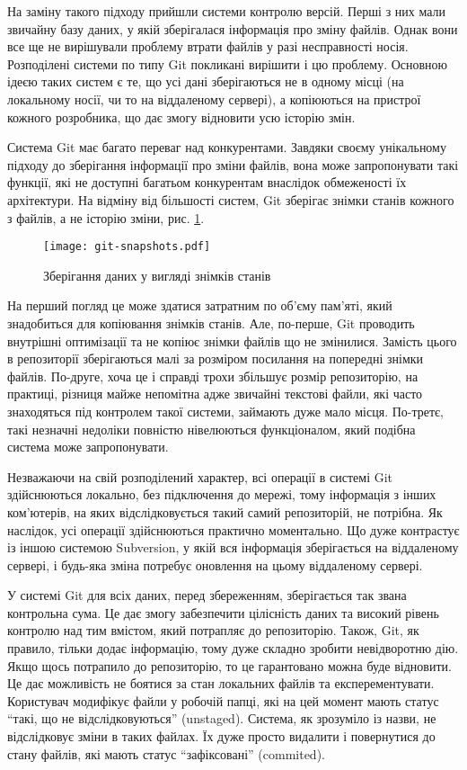 На заміну такого підходу прийшли системи контролю версій. Перші з них мали звичайну
базу даних, у якій зберігалася інформація про зміну файлів. Однак вони все ще не
вирішували проблему втрати файлів у разі несправності носія. Розподілені системи
по типу Git покликані вирішити і цю проблему. Основною ідеєю таких систем є те, що
усі дані зберігаються не в одному місці (на локальному носії, чи то на віддаленому
сервері), а копіюються на пристрої кожного розробника, що дає змогу відновити усю історію
змін.

Система Git має багато переваг над конкурентами. Завдяки своєму унікальному підходу
до зберігання інформації про зміни файлів, вона може запропонувати такі функції,
які не доступні багатьом конкурентам внаслідок обмеженості їх архітектури.
На відміну від більшості систем, Git зберігає знімки станів кожного з файлів, а не історію
зміни, рис. \ref{img:git_snapshots}.

\begin{figure}[ht]
  \begin{center}
    \texttt{[image: git-snapshots.pdf]}
  \end{center}
  \caption{Зберігання даних у вигляді знімків станів}
  \label{img:git_snapshots}
\end{figure}

На перший погляд це може здатися затратним по об'єму пам'яті, який знадобиться для 
копіювання знімків станів. Але, по-перше,
Git проводить внутрішні оптимізації та не копіює знімки
файлів що не змінилися. Замість цього в репозиторії зберігаються малі за розміром посилання
на попередні знімки файлів. По-друге, хоча це і справді трохи збільшує розмір репозиторію,
на практиці, різниця майже непомітна адже звичайні текстові файли, які часто знаходяться
під контролем такої системи, займають дуже мало місця. По-третє, такі незначні недоліки
повністю нівелюються функціоналом, який подібна система може запропонувати.

Незважаючи на свій розподілений характер, всі операції в системі Git здійснюються локально,
без підключення до мережі, тому інформація з інших ком'ютерів, на яких відслідковується
такий самий репозиторій, не потрібна. Як наслідок, усі операції здійснюються практично
моментально. Що дуже контрастує із іншою системою Subversion, у якій вся інформація
зберігається на віддаленому сервері, і будь-яка зміна потребує оновлення на цьому
віддаленому сервері.

У системі Git для всіх даних, перед збереженням, зберігається так звана контрольна сума.
Це дає змогу забезпечити цілісність даних та високий рівень контролю над тим
вмістом, який потрапляє до репозиторію. Також, Git, як правило, тільки додає
інформацію, тому дуже складно зробити невідворотню дію. Якщо щось потрапило до
репозиторію, то це гарантовано можна буде відновити. Це дає можливість не боятися
за стан локальних файлів та експерементувати. Користувач модифікує файли у робочій папці,
які на цей момент мають статус ``такі, що не відслідковуються'' (unstaged). Система,
як зрозуміло із назви, не відслідковує зміни в таких файлах. Їх дуже просто видалити
і повернутися до стану файлів, які мають статус ``зафіксовані'' (commited).

